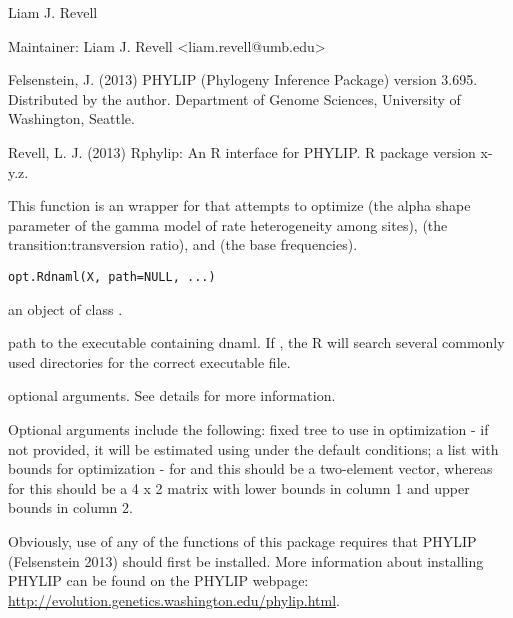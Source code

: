 \documentclass[a4paper]{book}
\begin{document}
%
\begin{Author}\relax
Liam J. Revell

Maintainer: Liam J. Revell <liam.revell@umb.edu>
\end{Author}
%
\begin{References}\relax
Felsenstein, J. (2013) PHYLIP (Phylogeny Inference Package) version 3.695. Distributed by the author. Department of Genome Sciences, University of Washington, Seattle.

Revell, L. J. (2013) Rphylip: An R interface for PHYLIP. R package version x-y.z.
\end{References}
%
\begin{Description}\relax
This function is an wrapper for  that attempts to optimize  (the alpha shape parameter of the gamma model of rate heterogeneity among sites),  (the transition:transversion ratio), and  (the base frequencies).
\end{Description}
%
\begin{Usage}
\begin{verbatim}
opt.Rdnaml(X, path=NULL, ...)
\end{verbatim}
\end{Usage}
%
\begin{Arguments}
\begin{ldescription}
\item[\code{X}] an object of class .
\item[\code{path}] path to the executable containing dnaml. If , the R will search several commonly used directories for the correct executable file.
\item[\code{...}] optional arguments. See details for more information.
\end{ldescription}
\end{Arguments}
%
\begin{Details}\relax
Optional arguments include the following:  fixed tree to use in optimization - if not provided, it will be estimated using  under the default conditions;  a list with bounds for optimization - for  and  this should be a two-element vector, whereas for  this should be a 4 x 2 matrix with lower bounds in column 1 and upper bounds in column 2.

Obviously, use of any of the functions of this package requires that PHYLIP (Felsenstein 2013) should first be installed. More information about installing PHYLIP can be found on the PHYLIP webpage: \url{http://evolution.genetics.washington.edu/phylip.html}.
\end{Details}
\end{document}
